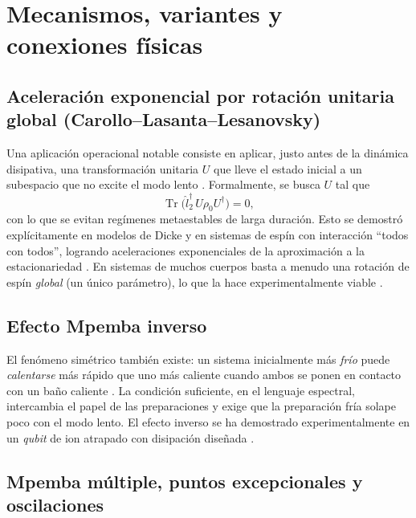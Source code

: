 \documentclass[11pt,a4paper]{article}
\theoremstyle{definition}
\theoremstyle{plain}
\renewcommand{\Tr}{\operatorname{Tr}}
\begin{document}
\section{Mecanismos, variantes y conexiones físicas}

\subsection{Aceleración exponencial por rotación unitaria global (Carollo--Lasanta--Lesanovsky)}

Una aplicación operacional notable consiste en aplicar, justo antes de la dinámica disipativa, una
transformación unitaria $U$ que lleve el estado inicial a un subespacio que no excite el modo lento
\cite{Carollo2021,Kochsiek2022}. Formalmente, se busca $U$ tal que
\begin{equation}
\Tr\!\big(\hat l_2^{\dagger}\,U\rho_0 U^{\dagger}\big)=0,
\end{equation}
con lo que se evitan regímenes metaestables de larga duración. Esto se demostró explícitamente en modelos
de Dicke y en sistemas de espín con interacción ``todos con todos'', logrando aceleraciones exponenciales
de la aproximación a la estacionariedad \cite{Carollo2021}. En sistemas de muchos cuerpos basta a menudo una
rotación de espín \emph{global} (un único parámetro), lo que la hace experimentalmente viable
\cite{Kochsiek2022}.

\subsection{Efecto Mpemba inverso}

El fenómeno simétrico también existe: un sistema inicialmente más \emph{frío} puede \emph{calentarse} más
rápido que uno más caliente cuando ambos se ponen en contacto con un baño caliente
\cite{LuRaz2017,AharonyShapira2024}. La condición suficiente, en el lenguaje espectral, intercambia el papel
de las preparaciones y exige que la preparación fría solape poco con el modo lento. El efecto inverso se ha
demostrado experimentalmente en un \emph{qubit} de ion atrapado con disipación diseñada
\cite{AharonyShapira2024}.

\subsection{Mpemba múltiple, puntos excepcionales y oscilaciones}
\end{document}

